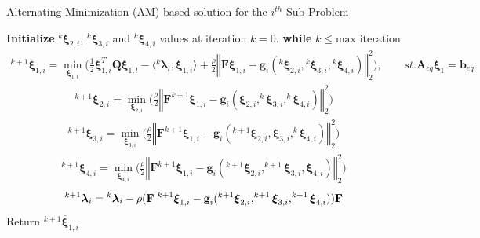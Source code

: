 


\begin{algorithm*}[!h]
 \caption{Alternating Minimization (AM) based solution for the $i^{th}$ Sub-Problem}\label{algo_batch}
    \textbf{Initialize} ${^{k}}\boldsymbol{\xi}_{2,i}$, ${^{k}}\boldsymbol{\xi}_{3,i}$ and ${^{k}}\boldsymbol{\xi}_{4,i}$ values at iteration $k=0$.
   \textbf{while} $k\leq \text{max iteration}$ 
\begin{align}
{^{k+1}}\boldsymbol{\xi}_{1,i} = \min_{\boldsymbol{\xi}_{1,i}}\Big(\frac{1}{2}\boldsymbol{\xi}_{1,i}^T\textbf{Q}\boldsymbol{\xi}_{1,l} 
 - \langle {^{k}}\boldsymbol{\lambda}_{i}, \boldsymbol{\xi}_{1,i}\rangle 
 +\frac{\rho}{2}\left\Vert \textbf{F}\boldsymbol{\xi}_{1,i}  
 -\textbf{g}_{i}({^{k}}\boldsymbol{\xi}_{2,i},{^{k}}\boldsymbol{\xi}_{3,i}, {^{k}}\boldsymbol{\xi}_{4,i}) \right \Vert_2^2 
  \Big )
  , \qquad
  st.\textbf{A}_{eq}\boldsymbol{\xi}_1 = \textbf{b}_{eq} \label{zeta_1_sepration_1}
 \end{align}
\begin{align}
{^{k+1}}\boldsymbol{\xi}_{2,i}  = \min_{\boldsymbol{\xi}_{2,i}}\Big( \frac{\rho}{2}\left\Vert \textbf{F}^{k+1} \boldsymbol{\xi}_{1,i}  
 -\textbf{g}_{i}(\boldsymbol{\xi}_{2,i}, ^{k}\boldsymbol{\xi}_{3,i}, ^{k}\boldsymbol{\xi}_{4,i}) \right \Vert_2^2 \Big) 
 \label{compute_ze_2}
\end{align}
\begin{align}
{^{k+1}}\boldsymbol{\xi}_{3,i}= \min_{\boldsymbol{\xi}_{3,i}}\Big(\frac{\rho}{2}\left\Vert \textbf{F}^{k+1} \boldsymbol{\xi}_{1,i} - \textbf{g}_{i}(^{k+1}\boldsymbol{\xi}_{2,i},\boldsymbol{\xi}_{3,i}, ^{k}\boldsymbol{\xi}_{4,i}) \right \Vert_2^2 \Big)
 \label{compute_ze_3}
\end{align}
\begin{align}
{^{k+1}}\boldsymbol{\xi}_{4,i}= \min_{\boldsymbol{\xi}_{4,i}}\Big(\frac{\rho}{2}\left\Vert \textbf{F}^{k+1} \boldsymbol{\xi}_{1,i} - \textbf{g}_{i}(^{k+1}\boldsymbol{\xi}_{2,i},^{k+1}\boldsymbol{\xi}_{3,i}, \boldsymbol{\xi}_{4,i}) \right \Vert_2^2 \Big)
 \label{compute_ze_4}
\end{align}
\begin{align}
{^{k+1}}\boldsymbol{\lambda}_{i}={^{k}}\boldsymbol{\lambda}_{i} - \rho( \textbf{F} \hspace{0.1cm} ^{k+1}\boldsymbol{\xi}_{1,i} 
 -\textbf{g}_{i}(^{k+1}\boldsymbol{\xi}_{2,i} , ^{k+1}\boldsymbol{\xi}_{3,i},^{k+1}\boldsymbol{\xi}_{4,i} ))\textbf{F}
\label{update_lambda_1} 
\end{align}
 Return ${^{k+1}}\overline{\boldsymbol{\xi}}_{1, i}$
\end{algorithm*}


